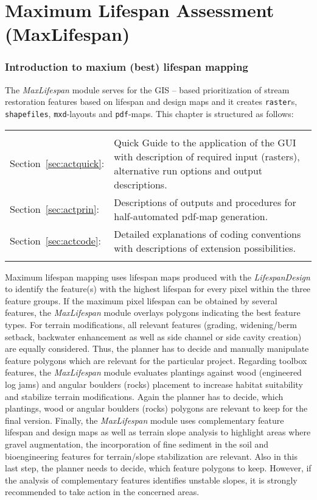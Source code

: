 \newpage
\part{Maximum Lifespan Assessment (MaxLifespan)} \label{part:ap}

\section{Introduction to maxium (best) lifespan mapping} \label{sec:actintro}
The \textit{MaxLifespan} module serves for the GIS -- based prioritization of stream restoration features based on lifespan and design maps and it creates \texttt{raster}s, \texttt{shapefiles}, \texttt{mxd}-layouts and \texttt{pdf}-maps. This chapter is structured as follows:\\
\begin{tabular}{l L{0.9\textwidth}}
\\
Section~\ref{sec:actquick}: & Quick Guide to the application of the GUI with description of required input (rasters), alternative run options and output descriptions.\\
Section~\ref{sec:actprin}:  & Descriptions of outputs and procedures for half-automated pdf-map generation.\\
Section~\ref{sec:actcode}:  & Detailed explanations of coding conventions with descriptions of extension possibilities.\\
\\
\end{tabular}

Maximum lifespan mapping uses lifespan maps produced with the \textit{LifespanDesign} to identify the feature(s) with the highest lifespan for every pixel within the three feature groups. If the maximum pixel lifespan can be obtained by several features, the \textit{MaxLifespan} module overlays polygons indicating the best feature types. For terrain modifications, all relevant features (grading, widening/berm setback, backwater enhancement as well as side channel or side cavity creation) are equally considered. Thus, the planner has to decide and manually manipulate feature polygons which are relevant for the particular project. Regarding toolbox features, the \textit{MaxLifespan} module evaluates plantings against wood (engineered log jams) and angular boulders (rocks) placement to increase habitat suitability and stabilize terrain modifications. Again the planner has to decide, which plantings, wood or angular boulders (rocks) polygons are relevant to keep for the final version. Finally, the \textit{MaxLifespan} module uses complementary feature lifespan and design maps as well as terrain slope analysis to highlight areas where gravel augmentation, the incorporation of fine sediment in the soil and bioengineering features for terrain/slope stabilization are relevant. Also in this last step, the planner needs to decide, which feature polygons to keep. However, if the analysis of complementary features identifies unstable slopes, it is strongly recommended to take action in the concerned areas.


